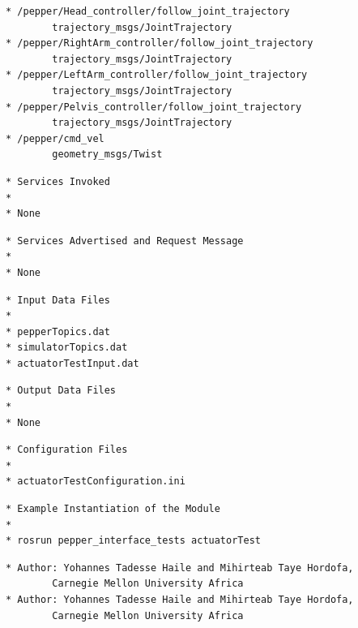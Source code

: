 \documentclass{CSSRforAfrica}
\newcommand{\checkboxChecked}{\fbox{\ding{51}}} %
\begin{document}
\begin{description}
{\begin{verbatim}
* /pepper/Head_controller/follow_joint_trajectory
        trajectory_msgs/JointTrajectory
* /pepper/RightArm_controller/follow_joint_trajectory
        trajectory_msgs/JointTrajectory
* /pepper/LeftArm_controller/follow_joint_trajectory
        trajectory_msgs/JointTrajectory
* /pepper/Pelvis_controller/follow_joint_trajectory
        trajectory_msgs/JointTrajectory
* /pepper/cmd_vel
        geometry_msgs/Twist
\end{verbatim}}

\item[\checkboxChecked]
{\small
\begin{verbatim} 
* Services Invoked
*
* None
\end{verbatim}}

\item[\checkboxChecked]
{\small
\begin{verbatim} 
* Services Advertised and Request Message
* 
* None
\end{verbatim}}

\item[\checkboxChecked] 
 {\small 
\begin{verbatim}
* Input Data Files
*
* pepperTopics.dat
* simulatorTopics.dat
* actuatorTestInput.dat
\end{verbatim}}

\item[\checkboxChecked] 
 {\small 
\begin{verbatim}
* Output Data Files
*
* None
\end{verbatim}}

\item[\checkboxChecked] 
 {\small 
\begin{verbatim}
* Configuration Files
*
* actuatorTestConfiguration.ini
\end{verbatim}}

\item[\checkboxChecked] 
 {\small 
\begin{verbatim}
* Example Instantiation of the Module
*
* rosrun pepper_interface_tests actuatorTest
\end{verbatim}}

\item[\checkboxChecked] 
 {\small 
\begin{verbatim}
* Author: Yohannes Tadesse Haile and Mihirteab Taye Hordofa,
        Carnegie Mellon University Africa
* Author: Yohannes Tadesse Haile and Mihirteab Taye Hordofa,
        Carnegie Mellon University Africa
\end{verbatim}}


\end{description}
\end{document}
